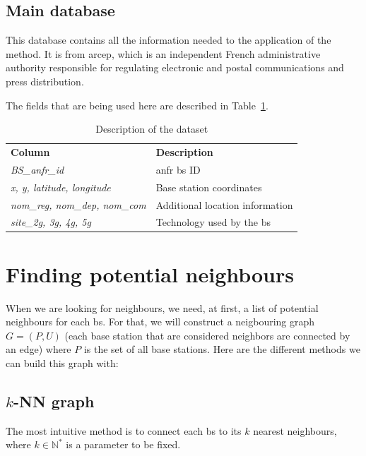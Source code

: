\documentclass[lettersize,journal,english]{IEEEtran}
\begin{document}
    \subsection{Main database}

    This database \cite{main_database} contains all the information needed to the application of the method. It is from
    \acrfull{arcep}, which is an independent French administrative authority responsible for regulating electronic and postal communications and press distribution.

    The fields that are being used here are described in Table~\ref{table:data_columns}.

\begin{table}[!b]
    \centering
    \caption{Description of the dataset}
    \label{table:data_columns}
    \begin{tabular}{ll}
        \toprule
        \textbf{Column} & \textbf{Description} \\
        \cmidrule(lr){1-2}
        \textsl{BS\_anfr\_id} & \acrshort{anfr} \acrshort{bs} ID \\ 
        \textsl{x, y, latitude, longitude} & Base station coordinates \\ 
        \textsl{nom\_reg, nom\_dep, nom\_com} & Additional location information \\  
        \textsl{site\_2g, 3g, 4g, 5g} & Technology used by the \acrshort{bs} \\ 
        \bottomrule
    \end{tabular}
\end{table}

\section{Finding potential neighbours}
\noindent When we are looking for neighbours, we need, at first, a list of potential neighbours for each \acrfull{bs}.
For that, we will construct a neigbouring graph $G = (P, U)$ (each base station that are considered neighbors are
connected by an edge) where $P$ is the set of all base stations. 
Here are the different methods we can build this graph with:

\subsection{$k$-NN graph}
\noindent The most intuitive method is to connect each \acrshort{bs} to its $k$ nearest neighbours, where $k \in \mathbb{N}^*$ 
is a parameter to be fixed. 
\end{document}
